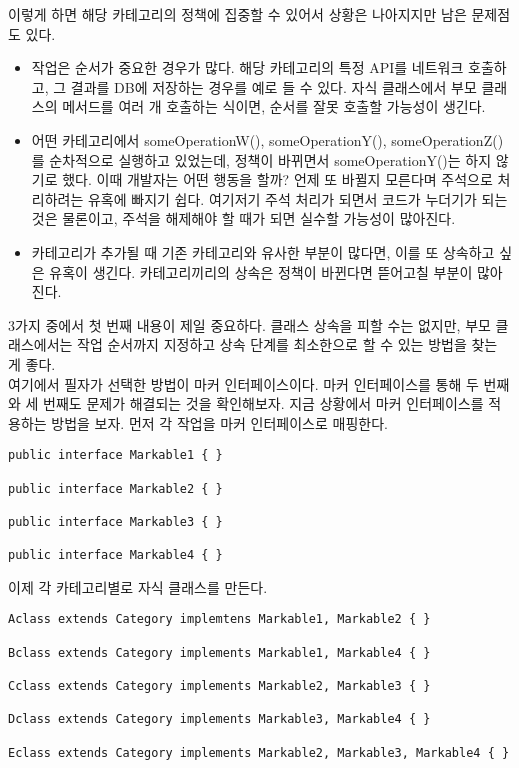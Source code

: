 이렇게 하면 해당 카테고리의 정책에 집중할 수 있어서 상황은 나아지지만 남은 문제점도 있다.
\begin{itemize}
\item 작업은 순서가 중요한 경우가 많다. 해당 카테고리의 특정 API를 네트워크 호출하고, 그 결과를 DB에 저장하는 경우를 예로 들 수 있다.
자식 클래스에서 부모 클래스의 메서드를 여러 개 호출하는 식이면, 순서를 잘못 호출할 가능성이 생긴다.

\item 어떤 카테고리에서 someOperationW(), someOperationY(), someOperationZ()를 순차적으로 실행하고 있었는데, 정책이 바뀌면서 someOperationY()는 하지 않기로 했다. 
이때 개발자는 어떤 행동을 할까? 
언제 또 바뀔지 모른다며 주석으로 처리하려는 유혹에 빠지기 쉽다. 여기저기 주석 처리가 되면서 코드가 누더기가 되는 것은 물론이고, 주석을 해제해야 할 때가 되면 실수할 가능성이 많아진다.

\item 카테고리가 추가될 때 기존 카테고리와 유사한 부분이 많다면, 이를 또 상속하고 싶은 유혹이 생긴다.
카테고리끼리의 상속은 정책이 바뀐다면 뜯어고칠 부분이 많아진다.
 
\end{itemize}

3가지 중에서 첫 번째 내용이 제일 중요하다. 
클래스 상속을 피할 수는 없지만, 부모 클래스에서는 작업 순서까지 지정하고 상속 단계를 최소한으로 할 수 있는 방법을 찾는 게 좋다.\\

여기에서 필자가 선택한 방법이 마커 인터페이스이다. 마커 인터페이스를 통해 두 번째와 세 번째도 문제가 해결되는 것을 확인해보자.
지금 상황에서 마커 인터페이스를 적용하는 방법을 보자.
먼저 각 작업을 마커 인터페이스로 매핑한다.\\

\begin{lstlisting}[frame=single]
public interface Markable1 { }

public interface Markable2 { }

public interface Markable3 { }

public interface Markable4 { }
\end{lstlisting}

 
이제 각 카테고리별로 자식 클래스를 만든다.

\begin{lstlisting}[frame=single]
Aclass extends Category implemtens Markable1, Markable2 { }

Bclass extends Category implements Markable1, Markable4 { }

Cclass extends Category implements Markable2, Markable3 { }

Dclass extends Category implements Markable3, Markable4 { }

Eclass extends Category implements Markable2, Markable3, Markable4 { }
\end{lstlisting}

